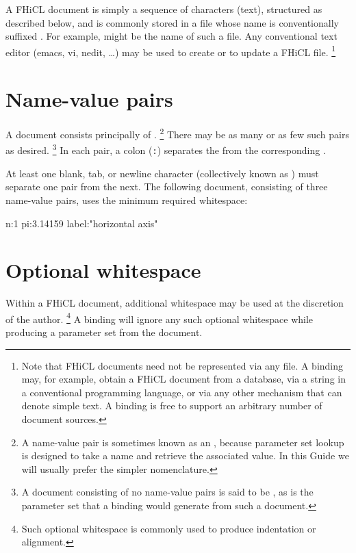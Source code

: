 \documentclass[draftmode,draftwater]{memarticle}
\newcommand{\fhicl}%
 {FHiCL\xspace}
\begin{document}
A \fhicl document is simply a sequence of characters (\ie text),
structured as described below, and is commonly stored in a file whose
name is conventionally suffixed .  For example,
 might be the name of such a file.  Any
conventional text editor (\eg emacs, vi, nedit, \ldots) may be used to
create or to update a \fhicl file.%
\footnote{%
  Note that \fhicl documents need not be represented via any file.  A
  binding may, for example, obtain a \fhicl document from a database,
  via a string in a conventional programming language, or via any
  other mechanism that can denote simple text.  A binding is free to
  support an arbitrary number of document sources.%
}

\section{Name-value pairs}

A document consists principally of .%
\footnote{%
  A name-value pair is sometimes known as an ,
  because parameter set lookup is designed to take a name and retrieve
  the associated value.  In this Guide we will usually prefer the
  simpler  nomenclature.%
} There may be as many or as few such pairs as desired.%
\footnote{%
  A document consisting of no name-value pairs is said to be
  , as is the parameter set that a binding would generate
  from such a document.%
} In each pair, a colon (\verb|:|) separates the  from the
corresponding .

At least one blank, tab, or newline character (collectively known as
) must separate one pair from the next.  The
following document, consisting of three name-value pairs, uses the
minimum required whitespace: 
\Needspace{.17in}
\begin{fcllisting}[texcl,escapechar=`]
n:1 pi:3.14159 label:"horizontal axis"
\end{fcllisting}

\section{Optional whitespace}

Within a \fhicl document, additional whitespace may be used at the
discretion of the author.%
\footnote{%
  Such optional whitespace is commonly used to produce indentation or
  alignment.%
} A binding will ignore any such optional whitespace while producing a
parameter set from the document.
\end{document}
